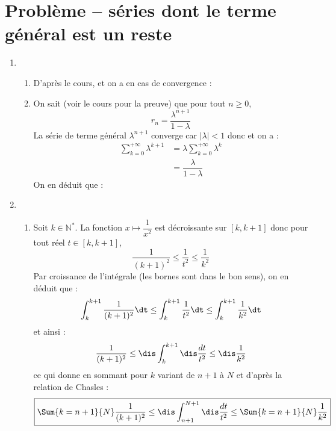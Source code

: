 \documentclass[a4paper,twoside,french,10pt]{VcCours}
\begin{document}
\section*{Problème -- séries dont le terme général est un reste}
\begin{enumerate}

    \item 
    
    \begin{enumerate}
        \item D'après le cours, 
        et on a en cas de convergence :
        \item On sait (voir le cours pour la preuve) que pour tout $n \geq 0$,
        $$ r_n = \dfrac{\lambda^{n+1}}{1-\lambda}$$
    La série de terme général $\lambda^{n+1}$ converge car $\vert \lambda \vert <1$ donc 
    et on a :
    \begin{align*}
    \sum_{k=0}^{+ \infty} \lambda^{k+1} & = \lambda \sum_{k=0}^{+ \infty} \lambda^k \\
    & = \dfrac{\lambda}{1-\lambda}
    \end{align*}
    On en déduit que :
    \end{enumerate}
    
    
    \item 
    \begin{enumerate}
    
    \item Soit $k \in \mathbb{N}^*$. La fonction $x \mapsto \dfrac{1}{x^2}$ est décroissante sur $[k,k+1]$ donc pour tout réel $t \in [k,k+1]$,
    $$ \dfrac{1}{(k+1)^2} \leq \dfrac{1}{t^2} \leq \dfrac{1}{k^2}$$
    Par croissance de l'intégrale (les bornes sont dans le bon sens), on en déduit que :
    $$  \int_{k}^{k+1} \dfrac{1}{(k+1)^2} \dt \leq \int_{k}^{k+1} \dfrac{1}{t^2} \dt  \leq \int_{k}^{k+1} \dfrac{1}{k^2} \dt$$
    et ainsi :
    $$ \frac{1}{(k+1)^2}\leq\dis\int_{k}^{k+1}\dis\frac{dt}{t^2}\leq
    \dis\frac{1}{k^2}$$
    ce qui donne en sommant pour $k$ variant de $n+1$ à $N$ et d'après la relation de Chasles :
    $$ \boxed{\Sum{k=n+1}{N}  \dfrac{1}{(k+1)^2}\leq\dis\int_{n+1}^{N+1}\dis\dfrac{dt}{t^2}\leq
    \Sum{k=n+1}{N} \dfrac{1}{k^2}}$$
    

\end{enumerate}
\end{enumerate}
\end{document}
